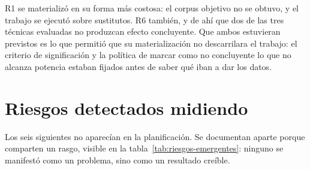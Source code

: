 R1 se materializó en su forma más costosa: el corpus objetivo no se obtuvo, y el trabajo se
ejecutó sobre sustitutos. R6 también, y de ahí que dos de las tres técnicas evaluadas no
produzcan efecto concluyente. Que ambos estuvieran previstos es lo que permitió que su
materialización no descarrilara el trabajo: el criterio de significación y la política de
marcar como no concluyente lo que no alcanza potencia estaban fijados antes de saber qué
iban a dar los datos.

\section{Riesgos detectados midiendo}

Los seis siguientes no aparecían en la planificación. Se documentan aparte porque comparten
un rasgo, visible en la tabla~\ref{tab:riesgos-emergentes}: ninguno se manifestó como un
problema, sino como un resultado creíble.

